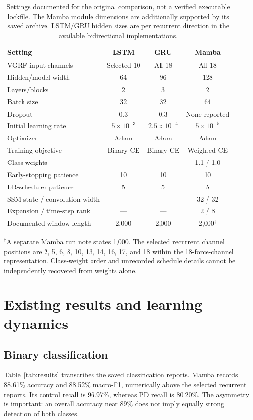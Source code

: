 \begin{table}[t]
\caption{Settings documented for the original comparison, not a verified executable lockfile. The Mamba module dimensions are additionally supported by its saved archive. LSTM/GRU hidden sizes are per recurrent direction in the available bidirectional implementations.}
\label{tab:settings}
\centering
\begin{tabular}{lccc}
\toprule
Setting & LSTM & GRU & Mamba\\
\midrule
VGRF input channels & Selected 10 & All 18 & All 18\\
Hidden/model width & 64 & 96 & 128\\
Layers/blocks & 2 & 3 & 2\\
Batch size & 32 & 32 & 64\\
Dropout & 0.3 & 0.3 & None reported\\
Initial learning rate & $5\times10^{-3}$ & $2.5\times10^{-4}$ & $5\times10^{-5}$\\
Optimizer & Adam & Adam & Adam\\
Training objective & Binary CE & Binary CE & Weighted CE\\
Class weights & --- & --- & 1.1 / 1.0\\
Early-stopping patience & 10 & 10 & 10\\
LR-scheduler patience & 5 & 5 & 5\\
SSM state / convolution width & --- & --- & 32 / 32\\
Expansion / time-step rank & --- & --- & 2 / 8\\
Documented window length & 2,000 & 2,000 & 2,000$^{\dagger}$\\
\bottomrule
\end{tabular}

\smallskip
\begin{minipage}{0.97\linewidth}
$^{\dagger}$A separate Mamba run note states 1,000. The selected recurrent channel positions are 2, 5, 6, 8, 10, 13, 14, 16, 17, and 18 within the 18-force-channel representation. Class-weight order and unrecorded schedule details cannot be independently recovered from weights alone.
\end{minipage}
\end{table}

\section{Existing results and learning dynamics}
\label{sec:results}
\subsection{Binary classification}
Table~\ref{tab:results} transcribes the saved classification reports. Mamba records 88.61\% accuracy and 88.52\% macro-F1, numerically above the selected recurrent reports. Its control recall is 96.97\%, whereas PD recall is 80.20\%. The asymmetry is important: an overall accuracy near 89\% does not imply equally strong detection of both classes.

